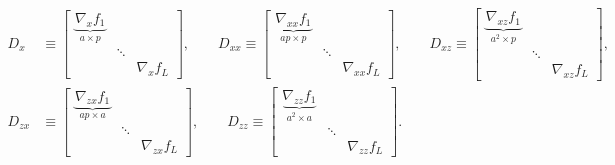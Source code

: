 \documentclass{article}
\begin{document}
\begin{align*}
    D_x    & \equiv  \begin{bmatrix}
                         \underbrace{\nabla_x f_1}_{a\times p} &                       \\
                                                               & \ddots                \\
                                                               &        & \nabla_x f_L
                     \end{bmatrix}
    , \qquad
    D_{xx} \equiv \begin{bmatrix}
                      \underbrace{\nabla_{xx} f_1}_{ap\times p} &        &                 \\
                                                                & \ddots &                 \\
                                                                &        & \nabla_{xx} f_L
                  \end{bmatrix}
    , \qquad
    D_{xz} \equiv
    \begin{bmatrix}
        \underbrace{\nabla_{xz} f_1}_{a^2 \times p} &        &                 \\
                                                    & \ddots &                 \\
                                                    &        & \nabla_{xz} f_L
    \end{bmatrix}
    ,                                                                                                \\
    D_{zx} & \equiv \begin{bmatrix}
                        \underbrace{\nabla_{zx} f_1}_{ap \times a} &        &                 \\
                                                                   & \ddots &                 \\
                                                                   &        & \nabla_{zx} f_L
                    \end{bmatrix}
    ,
    \qquad
    D_{zz}  \equiv \begin{bmatrix}
                       \underbrace{\nabla_{zz} f_1}_{a^2\times a} &        &                 \\
                                                                  & \ddots &                 \\
                                                                  &        & \nabla_{zz} f_L
                   \end{bmatrix}
    .
\end{align*}
\end{document}

